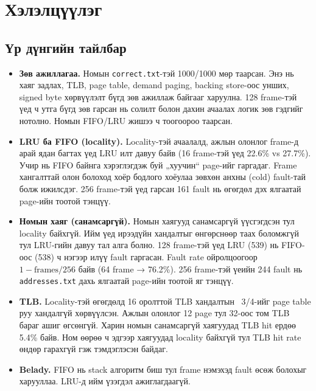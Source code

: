 \section{Хэлэлцүүлэг}
\subsection{Үр дүнгийн тайлбар}
\begin{itemize}
\item \textbf{Зөв ажиллагаа.} Номын \texttt{correct.txt}-тэй 1000/1000 мөр таарсан. Энэ нь хаяг задлах, TLB, page table, demand paging, backing store-оос унших, signed byte хөрвүүлэлт бүгд зөв ажиллаж байгааг харуулна. 128 frame-тэй үед ч утга бүгд зөв гарсан нь солилт болон дахин ачаалах логик зөв гэдгийг нотолно. Номын FIFO/LRU жишээ ч тоогоороо таарсан.
\item \textbf{LRU ба FIFO (locality).} Locality-тэй ачаалалд, ажлын олонлог frame-д арай ядан багтах үед LRU илт давуу байв (16 frame-тэй үед 22.6\% vs 27.7\%). Учир нь FIFO байнга хэрэглэгдэж буй „хуучин“ page-ийг гаргадаг. Frame хангалттай олон болоход хоёр бодлого хоёулаа зөвхөн анхны (cold) fault-тай болж ижилсдэг. 256 frame-тэй үед гарсан 161 fault нь өгөгдөл дэх ялгаатай page-ийн тоотой тэнцүү.
\item \textbf{Номын хаяг (санамсаргүй).} Номын хаягууд санамсаргүй үүсгэгдсэн тул locality байхгүй. Ийм үед ирээдүйн хандалтыг өнгөрснөөр таах боломжгүй тул LRU-гийн давуу тал алга болно. 128 frame-тэй үед LRU (539) нь FIFO-оос (538) ч нэгээр илүү fault гаргасан. Fault rate ойролцоогоор $1-\text{frames}/256$ байв (64 frame → 76.2\%). 256 frame-тэй үеийн 244 fault нь \texttt{addresses.txt} дахь ялгаатай page-ийн тоотой яг тэнцүү.
\item \textbf{TLB.} Locality-тэй өгөгдөлд 16 оролттой TLB хандалтын ~3/4-ийг page table руу хандалгүй хөрвүүлсэн. Ажлын олонлог 12 page тул 32-оос том TLB бараг ашиг өгсөнгүй. Харин номын санамсаргүй хаягуудад TLB hit ердөө 5.4\% байв. Ном өөрөө ч эдгээр хаягуудад locality байхгүй тул TLB hit rate өндөр гарахгүй гэж тэмдэглэсэн байдаг.
\item \textbf{Belady.} FIFO нь stack алгоритм биш тул frame нэмэхэд fault өсөж болохыг харууллаа. LRU-д ийм үзэгдэл ажиглагдаагүй.
\end{itemize}
